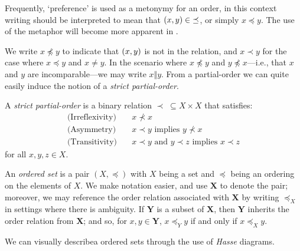 Frequently, `preference' is used as a metonymy for an order, in this context writing  should be interpreted to mean that $(x,y)\in \; \preceq$, or simply $x \preceq
y$. The use of the metaphor will become more apparent in .

We write $x \npreceq y$ to indicate that $(x,y)$ is not in the relation, and $x \prec y$ for the case where $x\preceq y$ and $x \not = y$. In the scenario where $x \not \preceq y$ and
$y \not \preceq x$---i.e., that $x$ and $y$ are incomparable---we may write $x \Vert y$. From a partial-order we can quite easily induce the notion of a \emph{strict partial-order}.

\begin{definition}
  \label{definition:strict-partial-order} A \textit{strict partial-order}  is a binary relation $\prec \; \subseteq X \times X$ that satisfies:
  \begin{align}
    \text{(Irreflexivity)}\quad & x \nprec x                                                \\
    \text{(Asymmetry)}\quad     & x \prec y \text{ implies }y \nprec x                      \\
    \text{(Transitivity)}\quad  & x \prec y \text{ and }y \prec z \text{ implies }x \prec z
  \end{align}
  for all $x,y,z \in X$.
\end{definition}

An \textit{ordered set} is a pair $(X, \preceq)$ with $X$ being a set and $\preceq$ being an ordering on the elements of $X$. We make notation easier, and use $\mathbf{X}$ to denote the pair; moreover,
we may reference the order relation associated with $\mathbf{X}$ by writing $\preceq_{X}$ in settings where there is ambiguity. If $\mathbf{Y}$ is a subset of $\mathbf{X}$, then $\mathbf{Y}$ inherits
the order relation from $\mathbf{X}$; and so, for $x,y \in \mathbf{Y}$, $x \preceq_{Y}y$ if and only if $x \preceq_{X}y$.

We can visually describea ordered sets through the use of \textit{Hasse} diagrams.

